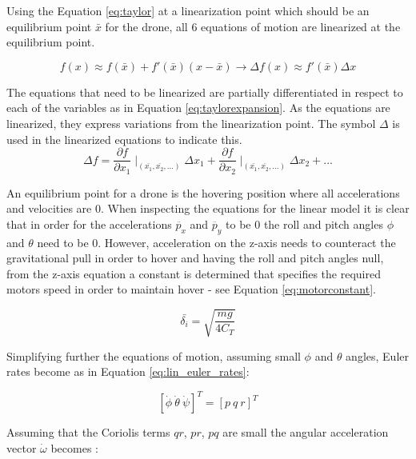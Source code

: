 Using the Equation \ref{eq:taylor} at a linearization point which should be an equilibrium point $\bar{x}$ for the drone, all 6 equations of motion are linearized at the equilibrium point.  

\begin{equation}  \label{eq:taylor}
f(x)\approx f(\bar{x})+{f}'(\bar{x})(x-\bar{x})\rightarrow \Delta f(x) \approx {f}'(\bar{x})\Delta x
\end{equation}

The equations that need to be linearized are partially differentiated in respect to each of the variables as in Equation \ref{eq:taylorexpansion}. As the equations are linearized, they express variations from the linearization point. The symbol $\Delta$ is used in the linearized equations to indicate this.\\

\begin{equation}  \label{eq:taylorexpansion}
\Delta f = \frac{\partial f}{\partial x_1}\mid_{(\bar{x_1}, \bar{x_2}, ...)} \Delta x_1 + \frac{\partial f}{\partial x_2}\mid_{(\bar{x_1}, \bar{x_2}, ...)} \Delta x_2 + ...
\end{equation}

An equilibrium point for a drone is the hovering position where all accelerations and velocities are 0. When inspecting the equations for the linear model it is clear that in order for the accelerations $\ddot{p_x}$ and $\ddot{p_y}$ to be 0 the roll and pitch angles $\phi$ and $\theta$ need to be 0. However, acceleration on the z-axis needs to counteract the gravitational pull in order to hover and having the roll and pitch angles null, from the z-axis equation a constant is determined that specifies the required motors speed in order to maintain hover - see Equation \ref{eq:motorconstant}.

\begin{equation}  \label{eq:motorconstant}
\bar{\delta_i} = \sqrt{\frac{mg}{4C_T}} 
\end{equation}

Simplifying further the equations of motion, assuming small $\phi$ and $\theta$ angles, Euler rates become as in Equation \ref{eq:lin_euler_rates}:

\begin{equation} \label{eq:lin_euler_rates}
	[\dot{\phi}\ \dot{\theta}\ \dot{\psi}]^T = [p\ q\ r]^T
\end{equation}

Assuming that the Coriolis terms $qr$, $pr$, $pq$ are small the angular acceleration vector $\dot{\omega}$ becomes \cite{beard_quadrotor}:

